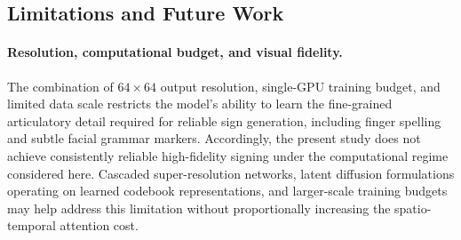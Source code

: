 \documentclass{ieeeaccess}
\begin{document}
\begin{table}[t]
    \centering
    \caption{Conditioning-control analysis for the strongest checkpoint (8-step DDIM, CFG$=5.0$). Cross-prompt distance measures mean MSE between generations from different prompts; same-prompt distance measures mean MSE across repeated generations of the same prompt. These are coarse pixel-space probes rather than linguistic faithfulness metrics.}
    \label{tab:conditioning_controls}
    \renewcommand{\arraystretch}{1.12}
\end{table}

\subsection{Limitations and Future Work}

\paragraph{Resolution, computational budget, and visual fidelity.} The combination of $64 \times 64$ output resolution, single-GPU training budget, and limited data scale restricts the model's ability to learn the fine-grained articulatory detail required for reliable sign generation, including finger spelling and subtle facial grammar markers. Accordingly, the present study does not achieve consistently reliable high-fidelity signing under the computational regime considered here. Cascaded super-resolution networks, latent diffusion formulations operating on learned codebook representations, and larger-scale training budgets may help address this limitation without proportionally increasing the spatio-temporal attention cost.
\end{document}
